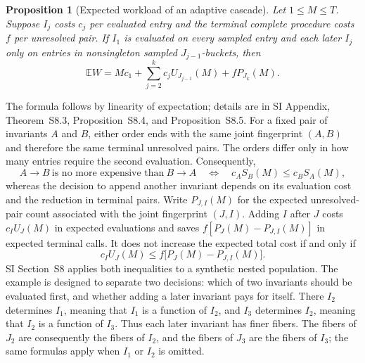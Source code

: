 \documentclass[9pt,twoside]{pnas-new}
\newtheorem{proposition}[theorem]{Proposition}
\theoremstyle{definition}
\theoremstyle{remark}
\newcommand{\SILocation}[1]{SI Appendix, #1}
\newcommand{\SICascadeWorkload}{Theorem~S8.3}
\newcommand{\SICascadeOrdering}{Proposition~S8.4}
\newcommand{\SICascadeBreakEven}{Proposition~S8.5}
\begin{document}
\begin{proposition}[Expected workload of an adaptive cascade]
\label{prop:adaptive-workload}
Let $1\le M\le T$.  Suppose $I_j$ costs $c_j$ per evaluated entry and the terminal complete procedure costs $f$ per unresolved pair.  If $I_1$ is evaluated on every sampled entry and each later $I_j$ only on entries in nonsingleton sampled $J_{j-1}$-buckets, then
\begin{equation}
 \mathbb E W
 =Mc_1+\sum_{j=2}^{k}c_jU_{J_{j-1}}(M)
   +fP_{J_k}(M).
 \label{eq:adaptive-workload}
\end{equation}
\end{proposition}

The formula follows by linearity of expectation; details are in \SILocation{\SICascadeWorkload{}, \SICascadeOrdering{}, and \SICascadeBreakEven{}}.  For a fixed pair of invariants $A$ and $B$, either order ends with the same joint fingerprint $(A,B)$ and therefore the same terminal unresolved pairs.  The orders differ only in how many entries require the second evaluation.  Consequently,
\begin{equation}
 A\rightarrow B\ \text{is no more expensive than}\ B\rightarrow A
 \quad\Longleftrightarrow\quad
 c_A S_B(M)\le c_B S_A(M),
 \label{eq:two-stage-order}
\end{equation}
whereas the decision to append another invariant depends on its evaluation cost and the reduction in terminal pairs.  Write $P_{J,I}(M)$ for the expected unresolved-pair count associated with the joint fingerprint $(J,I)$.  Adding $I$ after $J$ costs $c_IU_J(M)$ in expected evaluations and saves $f[P_J(M)-P_{J,I}(M)]$ in expected terminal calls.  It does not increase the expected total cost if and only if
\begin{equation}
 c_IU_J(M)\le f\bigl[P_J(M)-P_{J,I}(M)\bigr].
 \label{eq:marginal-break-even}
\end{equation}
SI Section~S8 applies both inequalities to a synthetic nested population.  The example is designed to separate two decisions: which of two invariants should be evaluated first, and whether adding a later invariant pays for itself.  There $I_2$ determines $I_1$, meaning that $I_1$ is a function of $I_2$, and $I_3$ determines $I_2$, meaning that $I_2$ is a function of $I_3$.  Thus each later invariant has finer fibers.  The fibers of $J_2$ are consequently the fibers of $I_2$, and the fibers of $J_3$ are the fibers of $I_3$; the same formulas apply when $I_1$ or $I_2$ is omitted.
\end{document}
